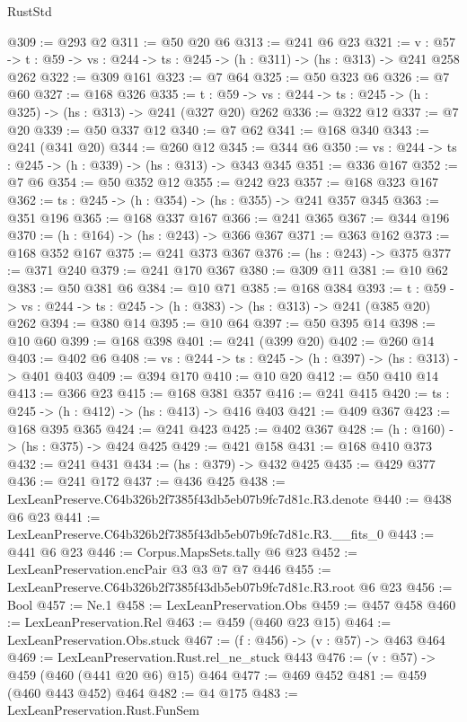 \begin{lexlean}{RustStd}
\begin{coremodule}
@309 := @293 @2
@311 := @50 @20 @6
@313 := @241 @6 @23
@321 := {v : @57} ->
  {t : @59} -> {vs : @244} -> {ts : @245} -> (h : @311) -> (hs : @313) -> @241 @258 @262
@322 := @309 @161
@323 := @7 @64
@325 := @50 @323 @6
@326 := @7 @60
@327 := @168 @326
@335 := {t : @59} -> {vs : @244} -> {ts : @245} -> (h : @325) -> (hs : @313) -> @241 (@327 @20) @262
@336 := @322 @12
@337 := @7 @20
@339 := @50 @337 @12
@340 := @7 @62
@341 := @168 @340
@343 := @241 (@341 @20)
@344 := @260 @12
@345 := @344 @6
@350 := {vs : @244} -> {ts : @245} -> (h : @339) -> (hs : @313) -> @343 @345
@351 := @336 @167
@352 := @7 @6
@354 := @50 @352 @12
@355 := @242 @23
@357 := @168 @323 @167
@362 := {ts : @245} -> (h : @354) -> (hs : @355) -> @241 @357 @345
@363 := @351 @196
@365 := @168 @337 @167
@366 := @241 @365
@367 := @344 @196
@370 := (h : @164) -> (hs : @243) -> @366 @367
@371 := @363 @162
@373 := @168 @352 @167
@375 := @241 @373 @367
@376 := (hs : @243) -> @375
@377 := @371 @240
@379 := @241 @170 @367
@380 := @309 @11
@381 := @10 @62
@383 := @50 @381 @6
@384 := @10 @71
@385 := @168 @384
@393 := {t : @59} -> {vs : @244} -> {ts : @245} -> (h : @383) -> (hs : @313) -> @241 (@385 @20) @262
@394 := @380 @14
@395 := @10 @64
@397 := @50 @395 @14
@398 := @10 @60
@399 := @168 @398
@401 := @241 (@399 @20)
@402 := @260 @14
@403 := @402 @6
@408 := {vs : @244} -> {ts : @245} -> (h : @397) -> (hs : @313) -> @401 @403
@409 := @394 @170
@410 := @10 @20
@412 := @50 @410 @14
@413 := @366 @23
@415 := @168 @381 @357
@416 := @241 @415
@420 := {ts : @245} -> (h : @412) -> (hs : @413) -> @416 @403
@421 := @409 @367
@423 := @168 @395 @365
@424 := @241 @423
@425 := @402 @367
@428 := (h : @160) -> (hs : @375) -> @424 @425
@429 := @421 @158
@431 := @168 @410 @373
@432 := @241 @431
@434 := (hs : @379) -> @432 @425
@435 := @429 @377
@436 := @241 @172
@437 := @436 @425
@438 := LexLeanPreserve.C64b326b2f7385f43db5eb07b9fc7d81c.R3.denote
@440 := @438 @6 @23
@441 := LexLeanPreserve.C64b326b2f7385f43db5eb07b9fc7d81c.R3.__fits_0
@443 := @441 @6 @23
@446 := Corpus.MapsSets.tally @6 @23
@452 := LexLeanPreservation.encPair @3 @3 @7 @7 @446
@455 := LexLeanPreserve.C64b326b2f7385f43db5eb07b9fc7d81c.R3.root @6 @23
@456 := Bool
@457 := Ne.{1}
@458 := LexLeanPreservation.Obs
@459 := @457 @458
@460 := LexLeanPreservation.Rel
@463 := @459 (@460 @23 @15)
@464 := LexLeanPreservation.Obs.stuck
@467 := (f : @456) -> (v : @57) -> @463 @464
@469 := LexLeanPreservation.Rust.rel_ne_stuck @443
@476 := (v : @57) -> @459 (@460 (@441 @20 @6) @15) @464
@477 := @469 @452
@481 := @459 (@460 @443 @452) @464
@482 := @4 @175
@483 := LexLeanPreservation.Rust.FunSem

\end{coremodule}
\end{lexlean}

